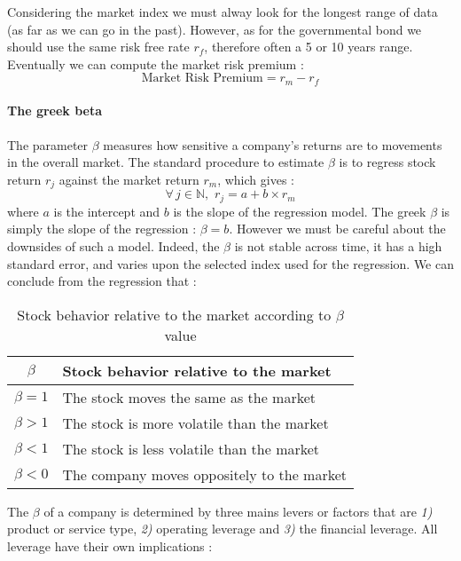 Considering the market index we must alway look for the longest range of data (as far as we can go in the past). However, as for the governmental bond we should use the same risk free rate $r_f$, therefore often a 5 or 10 years range. Eventually we can compute the market risk premium : 
$$
\text{Market Risk Premium} = r_m - r_f
$$

\paragraph{The greek beta}

The parameter $\beta$ measures how sensitive a company’s returns are to movements in the overall market. The standard procedure to estimate $\beta$ is to regress stock return $r_j$ against the market return $r_m$, which gives : 
\begin{equation}
    \forall\,j\in \mathbb{N},\,\, r_j = a+b\times r_m
\end{equation}
where $a$ is the intercept and $b$ is the slope of the regression model. The greek $\beta$ is simply the slope of the regression : $\beta = b$.  However we must be careful about the downsides of such a model. Indeed, the $\beta$ is not stable across time, it has a high standard error, and varies upon the selected index used for the regression. We can conclude from the regression that :
\begin{table}[H]
    \centering
    \begin{tabularx}{\textwidth}{cX}
        \toprule
        $\beta$ & \textbf{Stock behavior relative to the market} \\
        \midrule
        $\beta = 1$ & The stock moves the same as the market \\ 
        $\beta > 1$ & The stock is more volatile than the market \\
        $\beta < 1$ & The stock is less volatile than the market \\
        $\beta < 0$ & The company moves oppositely to the market \\
        \bottomrule
    \end{tabularx}
    \caption{Stock behavior relative to the market according to $\beta$ value}
    \label{tab:my_label}
\end{table}


The $\beta$ of a company is determined by three mains levers or factors that are \textit{1)} product or service type, \textit{2)} operating leverage and \textit{3)} the financial leverage. All leverage have their own implications : 

